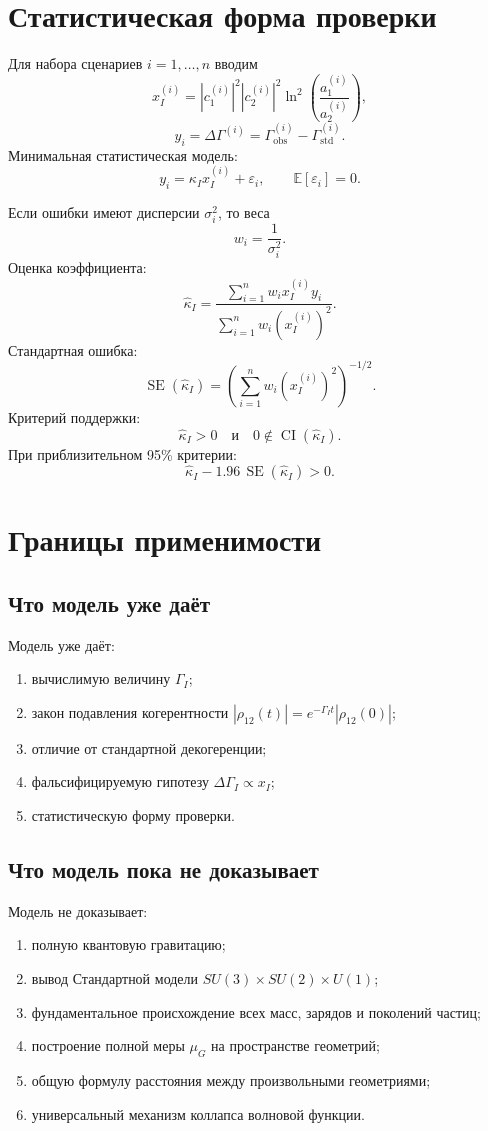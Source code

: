 \documentclass[12pt,a4paper]{article}
\DeclareMathOperator{\SE}{SE}
\DeclareMathOperator{\CI}{CI}
\newcommand{\std}{\mathrm{std}}
\newcommand{\obs}{\mathrm{obs}}
\begin{document}
\section{Статистическая форма проверки}

Для набора сценариев \(i=1,\dots,n\) вводим
\[
x_I^{(i)}=|c_1^{(i)}|^2|c_2^{(i)}|^2
\ln^2\left(\frac{a_1^{(i)}}{a_2^{(i)}}\right),
\]
\[
y_i=\Delta\Gamma^{(i)}=\Gamma_{\obs}^{(i)}-\Gamma_{\std}^{(i)}.
\]
Минимальная статистическая модель:
\[
\boxed{
y_i=\kappa_I x_I^{(i)}+\varepsilon_i,
\qquad
\mathbb E[\varepsilon_i]=0.
}
\]

Если ошибки имеют дисперсии \(\sigma_i^2\), то веса
\[
w_i=\frac{1}{\sigma_i^2}.
\]
Оценка коэффициента:
\[
\boxed{
\hat\kappa_I=
\frac{\sum_{i=1}^n w_i x_I^{(i)}y_i}{\sum_{i=1}^n w_i(x_I^{(i)})^2}.
}
\]
Стандартная ошибка:
\[
\boxed{
\SE(\hat\kappa_I)=
\left(\sum_{i=1}^n w_i(x_I^{(i)})^2\right)^{-1/2}.
}
\]
Критерий поддержки:
\[
\boxed{
\hat\kappa_I>0
\quad\text{и}\quad
0\notin \CI(\hat\kappa_I).
}
\]
При приблизительном 95\% критерии:
\[
\boxed{
\hat\kappa_I-1.96\,\SE(\hat\kappa_I)>0.
}
\]

\section{Границы применимости}

\subsection{Что модель уже даёт}

Модель уже даёт:
\begin{enumerate}[label=\arabic*.]
\item вычислимую величину \(\Gamma_I\);
\item закон подавления когерентности \(|\rho_{12}(t)|=e^{-\Gamma_I t}|\rho_{12}(0)|\);
\item отличие от стандартной декогеренции;
\item фальсифицируемую гипотезу \(\Delta\Gamma_I\propto x_I\);
\item статистическую форму проверки.
\end{enumerate}

\subsection{Что модель пока не доказывает}

Модель не доказывает:
\begin{enumerate}[label=\arabic*.]
\item полную квантовую гравитацию;
\item вывод Стандартной модели \(SU(3)\times SU(2)\times U(1)\);
\item фундаментальное происхождение всех масс, зарядов и поколений частиц;
\item построение полной меры \(\mu_G\) на пространстве геометрий;
\item общую формулу расстояния между произвольными геометриями;
\item универсальный механизм коллапса волновой функции.
\end{enumerate}
\end{document}
